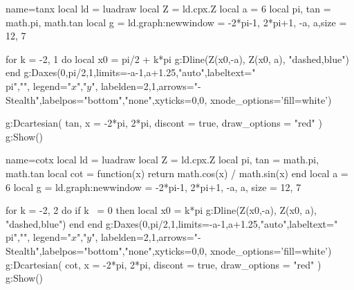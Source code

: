 \documentclass{standalone}
\begin{document}
\begin{luadraw}{name=tanx}
local ld = luadraw
local Z = ld.cpx.Z
local a = 6
local pi, tan = math.pi, math.tan
local g = ld.graph:new{window = {-2*pi-1, 2*pi+1, -a, a},size = {12, 7}}

for k = -2, 1 do
    local x0 = pi/2 + k*pi
    g:Dline(Z(x0,-a), Z(x0, a), "dashed,blue")
end
g:Daxes({0,pi/2,1},{limits={{-a-1,a+1.25},"auto"},labeltext={"\\pi",""}, legend={"$x$","$y$"}, labelden={2,1},arrows="-Stealth",labelpos={"bottom","none"},xyticks={0,0}, xnode_options='fill=white'})

g:Dcartesian(
    tan, {
        x = {-2*pi, 2*pi},
        discont = true,
        draw_options = "red"
    })
g:Show()
\end{luadraw}


\begin{luadraw}{name=cotx}
local ld = luadraw
local Z = ld.cpx.Z
local pi, tan = math.pi, math.tan
local cot = function(x) return math.cos(x) / math.sin(x) end
local a = 6
local g = ld.graph:new{window = {-2*pi-1, 2*pi+1, -a, a}, size = {12, 7}}

for k = -2, 2 do
    if k ~= 0 then
        local x0 = k*pi
        g:Dline(Z(x0,-a), Z(x0, a), "dashed,blue")
    end
end
g:Daxes({0,pi/2,1},{limits={{-a-1,a+1.25},"auto"},labeltext={"\\pi",""}, legend={"$x$","$y$"}, labelden={2,1},arrows="-Stealth",labelpos={"bottom","none"},xyticks={0,0}, xnode_options='fill=white'})
g:Dcartesian(
    cot, {
        x = {-2*pi, 2*pi},
        discont = true,
        draw_options = "red"
    })
g:Show()
\end{luadraw}
\end{document}
